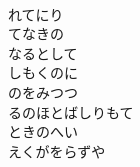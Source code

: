 \documentclass[10pt,b5j]{tarticle} %
\begin{document}
\begin{enumerate}
\begin{minipage}[c]{\blocksize}
    \end{minipage}
    \begin{minipage}[c]{\blocksize}
        
        \vspace{\linespace}
        \item~\\
        れてにり\\
        てなきの\\
        なるとして\\
        しもくのに\\
        のをみつつ\\
        るのほとばしりもて\\
        ときのへい\\
        えくがをらずや 
    
    \end{minipage}
\end{enumerate} %
\end{document}
